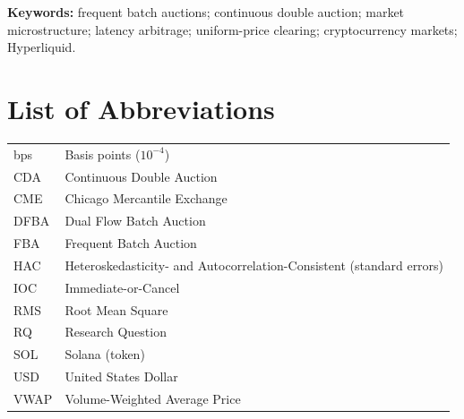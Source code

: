\vspace{0.6em}
\noindent\textbf{Keywords:} frequent batch auctions; continuous double auction; market microstructure; latency arbitrage; uniform-price clearing; cryptocurrency markets; Hyperliquid.

\setcounter{secnumdepth}{-1}



\setcounter{secnumdepth}{2}

\cleardoublepage
\setcounter{tocdepth}{1}
\tableofcontents
\cleardoublepage
{}
\listoffigures
\cleardoublepage
{}
\listoftables

\cleardoublepage
\chapter*{List of Abbreviations}

\begin{tabular}{ll}
\toprule
bps   & Basis points ($10^{-4}$)\\
CDA   & Continuous Double Auction\\
CME   & Chicago Mercantile Exchange\\
DFBA  & Dual Flow Batch Auction\\
FBA   & Frequent Batch Auction\\
HAC   & Heteroskedasticity- and Autocorrelation-Consistent (standard errors)\\
IOC   & Immediate-or-Cancel\\
RMS   & Root Mean Square\\
RQ    & Research Question\\
SOL   & Solana (token)\\
USD   & United States Dollar\\
VWAP  & Volume-Weighted Average Price\\
\bottomrule
\end{tabular}
